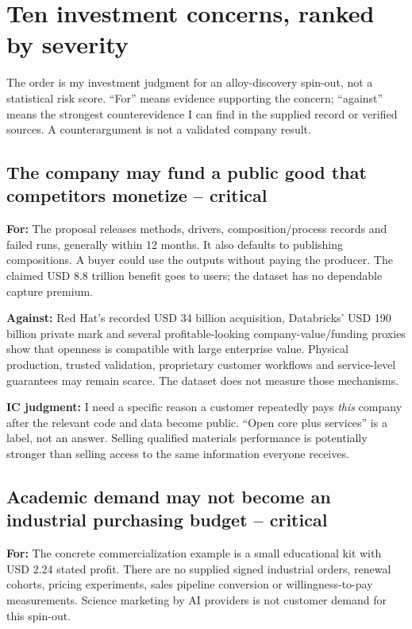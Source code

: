 \section{Ten investment concerns, ranked by
severity}\label{ten-investment-concerns-ranked-by-severity}

The order is my investment judgment for an alloy-discovery spin-out, not
a statistical risk score. ``For'' means evidence supporting the concern;
``against'' means the strongest counterevidence I can find in the
supplied record or verified sources. A counterargument is not a
validated company result.

\subsection{The company may fund a public good that competitors monetize
--
critical}\label{the-company-may-fund-a-public-good-that-competitors-monetize-critical}

\textbf{For:} The proposal releases methods, drivers,
composition/process records and failed runs, generally within 12 months.
It also defaults to publishing compositions. A buyer could use the
outputs without paying the producer. The claimed USD 8.8 trillion
benefit goes to users; the dataset has no dependable capture premium.
\citep{Hoffmann2024Value,InputProposal}

\textbf{Against:} Red Hat's recorded USD 34 billion acquisition,
Databricks' USD 190 billion private mark and several profitable-looking
company-value/funding proxies show that openness is compatible with
large enterprise value. Physical production, trusted validation,
proprietary customer workflows and service-level guarantees may remain
scarce. The dataset does not measure those mechanisms.

\textbf{IC judgment:} I need a specific reason a customer repeatedly
pays \emph{this} company after the relevant code and data become public.
``Open core plus services'' is a label, not an answer. Selling qualified
materials performance is potentially stronger than selling access to the
same information everyone receives.

\subsection{Academic demand may not become an industrial purchasing
budget --
critical}\label{academic-demand-may-not-become-an-industrial-purchasing-budget-critical}

\textbf{For:} The concrete commercialization example is a small
educational kit with USD 2.24 stated profit. There are no supplied
signed industrial orders, renewal cohorts, pricing experiments, sales
pipeline conversion or willingness-to-pay measurements. Science
marketing by AI providers is not customer demand for this spin-out.
\citep{InputBrief,InputRecommendations}

